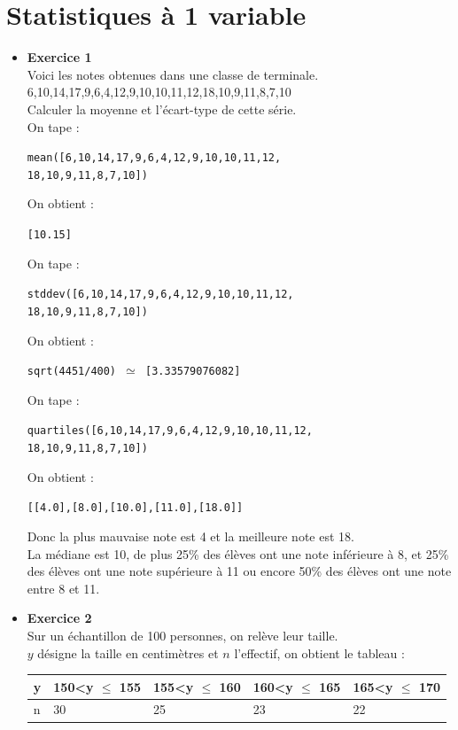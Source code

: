 \documentclass[a4paper,11pt]{book}
\begin{document}
\section{Statistiques \`a 1 variable}
\begin{itemize}
\item {\bf Exercice 1}\\
Voici les notes obtenues dans une classe de terminale.\\
6,10,14,17,9,6,4,12,9,10,10,11,12,18,10,9,11,8,7,10\\
Calculer la moyenne et l'\'ecart-type de cette s\'erie.\\
On tape :
\begin{center}{\tt mean([6,10,14,17,9,6,4,12,9,10,10,11,12,\\
18,10,9,11,8,7,10])}\end{center}
On obtient :
\begin{center}{\tt [10.15]}\end{center}
On tape :
\begin{center}{\tt stddev([6,10,14,17,9,6,4,12,9,10,10,11,12,\\18,10,9,11,8,7,10])}\end{center}
On obtient :
\begin{center}{\tt sqrt(4451/400) $\simeq$ [3.33579076082]}\end{center}
On tape :
\begin{center}{\tt quartiles([6,10,14,17,9,6,4,12,9,10,10,11,12,\\18,10,9,11,8,7,10])}\end{center}
On obtient :
\begin{center}{\tt [[4.0],[8.0],[10.0],[11.0],[18.0]]}\end{center}
Donc la plus mauvaise note est 4 et la meilleure note est 18.\\
La m\'ediane est 10, de plus  25\% des \'el\`eves ont une note inf\'erieure 
\`a 8, et 25\% des \'el\`eves ont une note sup\'erieure \`a 11 ou encore
50\%  des \'el\`eves ont une note entre 8 et 11.
\item {\bf Exercice 2}\\
Sur un \'echantillon de 100 personnes, on rel\`eve leur taille.\\
 $y$ d\'esigne la taille en 
centim\`etres et $n$ l'effectif, on obtient le tableau :\\
\begin{center}{\tt \begin{tabular}{|l|l|l|l|l|}
\hline
y & 150<y $\leq$ 155 & 155<y $\leq$ 160 & 160<y $\leq$ 165 &165<y $\leq$ 170\\
\hline
n & 30 & 25 & 23&22\\
\hline
\end{tabular}}\end{center}

\end{itemize}
\end{document}
